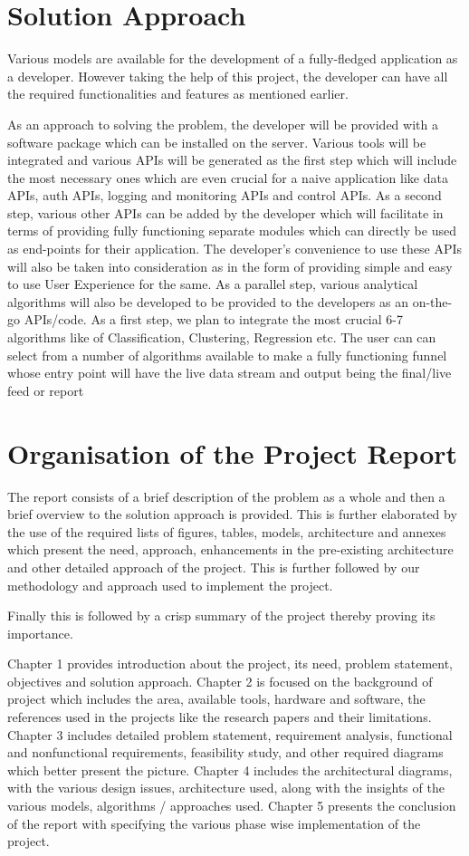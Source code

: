 \documentclass[a4paper]{report}
\begin{document}
    \section{Solution Approach}
Various models are available for the development of a fully-fledged application as a developer. However taking the help of this project, the developer can have all the required functionalities and features as mentioned earlier.

As an approach to solving the problem, the developer will be provided with a software package which can be installed on the server. Various tools will be integrated and various APIs will be generated as the first step which will include the most necessary ones which are even crucial for a naive application like data APIs, auth APIs, logging and monitoring APIs and control APIs.
As a second step, various other APIs can be added by the developer which will facilitate in terms of providing fully functioning separate modules which can directly be used as end-points for their application.
The developer’s convenience to use these APIs will also be taken into consideration as in the form of providing simple and easy to use User Experience for the same.
As a parallel step, various analytical algorithms will also be developed to be provided to the developers as an on-the-go APIs/code. As a first step, we plan to integrate the most crucial 6-7 algorithms like of Classification, Clustering, Regression etc.
The user can can select from a number of algorithms available to make a fully functioning funnel whose entry point will have the live data stream and output being the final/live feed or report    
\section{Organisation of the Project Report}    
The report consists of a brief description of the problem as a whole and then a brief overview to the solution approach is provided. This is further elaborated by the use of the required lists of figures, tables, models, architecture and annexes which present the need, approach, enhancements in the pre-existing architecture and other detailed approach of the project. This is further followed by our methodology and approach used to implement the project.

Finally this is followed by a crisp summary of the project thereby proving its importance.

Chapter 1 provides introduction about the project, its need, problem statement, objectives and solution approach.
Chapter 2 is focused on the background of project which includes the area, available tools, hardware and software, the references used in the projects like the research papers and their limitations.
Chapter 3 includes detailed problem statement, requirement analysis, functional and nonfunctional requirements, feasibility study, and other required diagrams which better present the picture.
Chapter 4 includes the architectural diagrams, with the various design issues, architecture used, along with the insights of the various models, algorithms / approaches used.
Chapter 5 presents the conclusion of the report with specifying the various phase wise implementation of the project.
\end{document}
